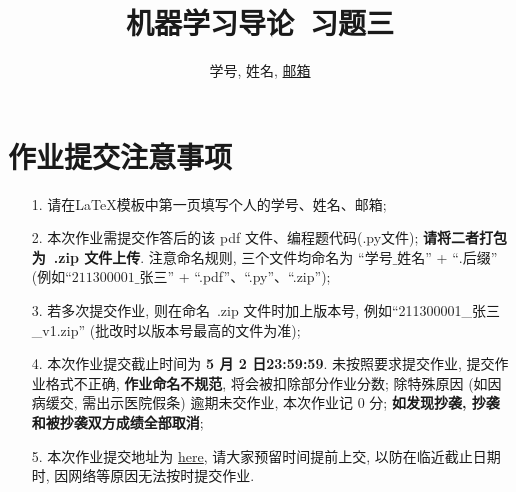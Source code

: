 \documentclass[a4paper,UTF8]{article}
\numberwithin{equation}{section}
\theoremstyle{definition}
\begin{document}
\title{机器学习导论\ 习题三}
\author{学号, 姓名, \href{mailto:邮箱}{邮箱}}
\maketitle
\section*{作业提交注意事项}
\begin{tcolorbox}
	\begin{enumerate}
		\item[1.] 请在LaTeX模板中第一页填写个人的学号、姓名、邮箱;
		\item[2.] 本次作业需提交作答后的该 pdf 文件、编程题代码(.py文件); {\color{red}\textbf{请将二者打包为~.zip 文件上传}}. 注意命名规则, 三个文件均命名为 “$\text{学号}\_\text{姓名}$” + “$.\text{后缀}$” (例如“$\text{211300001}\_\text{张三}$” + “.pdf”、“.py”、“.zip”);
		\item[3.] 若多次提交作业, 则在命名~.zip 文件时加上版本号, 例如“211300001\_张三\_v1.zip” (批改时以版本号最高的文件为准);
		\item[4.] 本次作业提交截止时间为 {\color{red}\textbf{ 5 月 2 日23:59:59}}. 未按照要求提交作业, 提交作业格式不正确, {\color{red}\textbf{作业命名不规范}}, 将会被扣除部分作业分数; 除特殊原因 (如因病缓交, 需出示医院假条) 逾期未交作业, 本次作业记 0 分; {\color{red}\textbf{如发现抄袭, 抄袭和被抄袭双方成绩全部取消}};
		\item[5.] 本次作业提交地址为 \href{https://box.nju.edu.cn/u/d/71102ced9a9b4d6f8d05/}{here}, 请大家预留时间提前上交, 以防在临近截止日期时, 因网络等原因无法按时提交作业.
	\end{enumerate}
\end{tcolorbox}
\newpage
\end{document}
